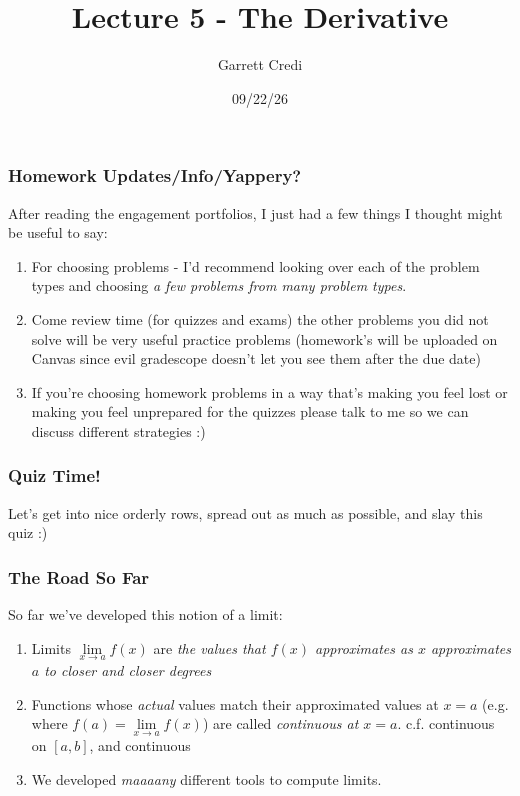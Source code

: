 \documentclass{ltx-talk}
\title{Lecture 5 - The Derivative}
\author{Garrett Credi}
\date{09/22/26}
\begin{document}
\begin{frame}
  \maketitle
\end{frame}

\begin{frame}
  \frametitle{Homework Updates/Info/Yappery?}

  After reading the engagement portfolios, I just had a few things I thought might be useful to say: \pause

  \begin{enumerate}
    \item For choosing problems - I'd recommend looking over each of the problem types and choosing \textit{a few problems from many problem types}. \pause
    \item Come review time (for quizzes and exams) the other problems you did not solve will be very useful practice problems \pause (homework's will be uploaded on Canvas since evil gradescope doesn't let you see them after the due date) \pause
    \item If you're choosing homework problems in a way that's making you feel lost or making you feel unprepared for the quizzes please talk to me so we can discuss different strategies :)
  \end{enumerate}
\end{frame}

\begin{frame}
  \frametitle{Quiz Time!}

  Let's get into nice orderly rows, spread out as much as possible, and slay this quiz :)
\end{frame}

\begin{frame}
  \frametitle{The Road So Far}

  So far we've developed this notion of a limit: \pause
  \begin{enumerate}
    \item Limits $\lim\limits_{x \rightarrow a} f(x)$ \pause are \textit{the values that $f(x)$ approximates as $x$ approximates $a$ to closer and closer degrees} \pause
    \item Functions whose \textit{actual} values 
      match their approximated values at $x = a$ \pause 
      (e.g. where $f(a) = \lim\limits_{x \rightarrow a} f(x)$) 
      are called \pause \textit{continuous at $x = a$}. 
      \pause c.f. continuous on $[a,b]$, and continuous \pause
    \item We developed \textit{maaaany} different tools to compute limits. 
  \end{enumerate}
\end{frame}
\end{document}
